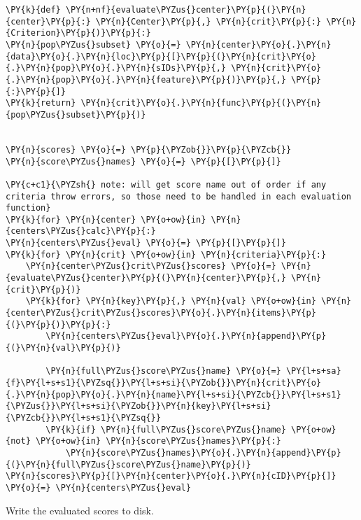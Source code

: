 \begin{tcolorbox}[breakable, size=fbox, boxrule=1pt, pad at break*=1mm,colback=cellbackground, colframe=cellborder]
\begin{Verbatim}[commandchars=\\\{\}]
\PY{k}{def} \PY{n+nf}{evaluate\PYZus{}center}\PY{p}{(}\PY{n}{center}\PY{p}{:} \PY{n}{Center}\PY{p}{,} \PY{n}{crit}\PY{p}{:} \PY{n}{Criterion}\PY{p}{)}\PY{p}{:}
\PY{n}{pop\PYZus{}subset} \PY{o}{=} \PY{n}{center}\PY{o}{.}\PY{n}{data}\PY{o}{.}\PY{n}{loc}\PY{p}{[}\PY{p}{(}\PY{n}{crit}\PY{o}{.}\PY{n}{pop}\PY{o}{.}\PY{n}{sIDs}\PY{p}{,} \PY{n}{crit}\PY{o}{.}\PY{n}{pop}\PY{o}{.}\PY{n}{feature}\PY{p}{)}\PY{p}{,} \PY{p}{:}\PY{p}{]}
\PY{k}{return} \PY{n}{crit}\PY{o}{.}\PY{n}{func}\PY{p}{(}\PY{n}{pop\PYZus{}subset}\PY{p}{)}


\PY{n}{scores} \PY{o}{=} \PY{p}{\PYZob{}}\PY{p}{\PYZcb{}}
\PY{n}{score\PYZus{}names} \PY{o}{=} \PY{p}{[}\PY{p}{]}

\PY{c+c1}{\PYZsh{} note: will get score name out of order if any criteria throw errors, so those need to be handled in each evaluation function}
\PY{k}{for} \PY{n}{center} \PY{o+ow}{in} \PY{n}{centers\PYZus{}calc}\PY{p}{:}
\PY{n}{centers\PYZus{}eval} \PY{o}{=} \PY{p}{[}\PY{p}{]}
\PY{k}{for} \PY{n}{crit} \PY{o+ow}{in} \PY{n}{criteria}\PY{p}{:}
    \PY{n}{center\PYZus{}crit\PYZus{}scores} \PY{o}{=} \PY{n}{evaluate\PYZus{}center}\PY{p}{(}\PY{n}{center}\PY{p}{,} \PY{n}{crit}\PY{p}{)}
    \PY{k}{for} \PY{n}{key}\PY{p}{,} \PY{n}{val} \PY{o+ow}{in} \PY{n}{center\PYZus{}crit\PYZus{}scores}\PY{o}{.}\PY{n}{items}\PY{p}{(}\PY{p}{)}\PY{p}{:}
        \PY{n}{centers\PYZus{}eval}\PY{o}{.}\PY{n}{append}\PY{p}{(}\PY{n}{val}\PY{p}{)}

        \PY{n}{full\PYZus{}score\PYZus{}name} \PY{o}{=} \PY{l+s+sa}{f}\PY{l+s+s1}{\PYZsq{}}\PY{l+s+si}{\PYZob{}}\PY{n}{crit}\PY{o}{.}\PY{n}{pop}\PY{o}{.}\PY{n}{name}\PY{l+s+si}{\PYZcb{}}\PY{l+s+s1}{\PYZus{}}\PY{l+s+si}{\PYZob{}}\PY{n}{key}\PY{l+s+si}{\PYZcb{}}\PY{l+s+s1}{\PYZsq{}}
        \PY{k}{if} \PY{n}{full\PYZus{}score\PYZus{}name} \PY{o+ow}{not} \PY{o+ow}{in} \PY{n}{score\PYZus{}names}\PY{p}{:}
            \PY{n}{score\PYZus{}names}\PY{o}{.}\PY{n}{append}\PY{p}{(}\PY{n}{full\PYZus{}score\PYZus{}name}\PY{p}{)}
\PY{n}{scores}\PY{p}{[}\PY{n}{center}\PY{o}{.}\PY{n}{cID}\PY{p}{]} \PY{o}{=} \PY{n}{centers\PYZus{}eval}
\end{Verbatim}
\end{tcolorbox}

Write the evaluated scores to disk.

